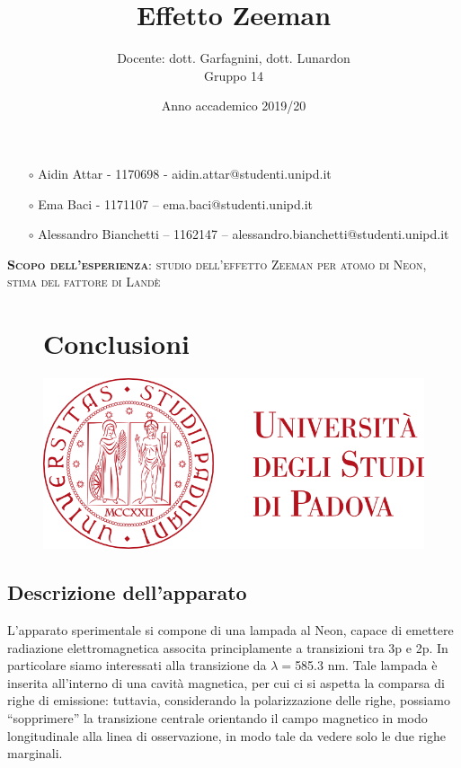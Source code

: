 \documentclass{article}
\title{Effetto Zeeman}
\author{Docente: dott. Garfagnini, dott. Lunardon \\
	Gruppo 14}
\date{Anno accademico 2019/20}
\begin{document}
	
	
	
	\maketitle
	
	\begin{itemize}
		\item[$\circ$] Aidin Attar - 1170698 - aidin.attar@studenti.unipd.it
		\item[$\circ$] Ema Baci - 1171107 – ema.baci@studenti.unipd.it
		\item[$\circ$] Alessandro Bianchetti – 1162147 – alessandro.bianchetti@studenti.unipd.it
	\end{itemize}
	
	\vspace{3 cm}
	\begin{large}\textsc{\textbf{Scopo dell'esperienza}: studio dell'effetto Zeeman per atomo di Neon, stima del fattore di Landè} 
	\end{large}
	\vspace{8.5cm}
	
	\begin{figure}[H]
		\centering
		\section{Conclusioni}\includegraphics[scale = 0.5 , angle=0]{unipd_logo.png}
	\end{figure}
	
	
	\twocolumn
	
	\subsection*{Descrizione dell'apparato} 
	
	L'apparato sperimentale si compone di una lampada al Neon, capace di emettere
	radiazione elettromagnetica associta principlamente a transizioni tra 3p e 2p.
	In particolare siamo interessati alla transizione da $\lambda = $585.3 nm.
	Tale lampada è inserita all'interno di una cavità magnetica, per cui ci si 
	aspetta la comparsa di righe di emissione: tuttavia, considerando la 
	polarizzazione delle righe, possiamo “sopprimere” la transizione centrale
	orientando il campo magnetico in modo longitudinale alla linea di 
	osservazione, in modo tale da vedere solo le due righe marginali. 
	
\end{document}
